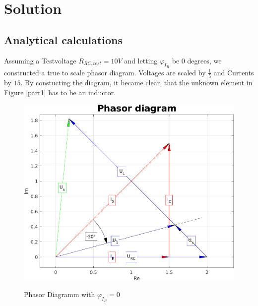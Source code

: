 \documentclass[a4paper]{article}
\begin{document}
\section{Solution}
\subsection{Analytical calculations}
Assuming a Testvoltage $R_{RC, test} = 10V$ and letting $\varphi_{I_{R}}$ be $0$ degrees, we
constructed a true to scale phasor diagram. Voltages are scaled by  $\frac{1}{5}$ and Currents by
$15$. By constucting the diagram, it became clear, that the unknown element in Figure \ref{part1}
has to be an inductor.

\begin{figure}[h!]
	\centering
	\includegraphics[scale=0.8]{./Figures/phasors_1.png}
	\label{phasor_dia_1}
	\caption{Phasor Diagramm with $\varphi_{I_{R}} = 0$}
\end{figure}

\newpage
\end{document}
